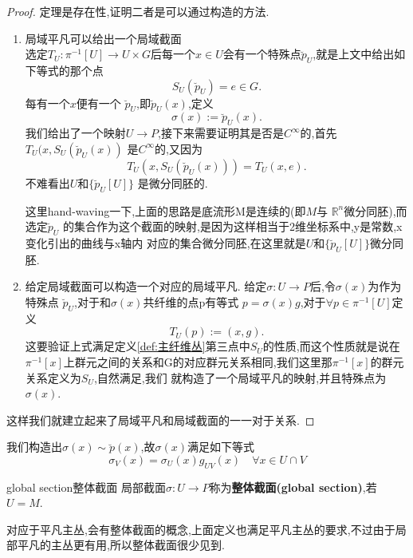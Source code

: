 \documentclass[../main.tex]{subfiles}
\begin{document}
\begin{proof}
  定理是存在性,证明二者是可以通过构造的方法.
  \begin{enumerate}
    \item 局域平凡可以给出一个局域截面\\
  选定$T_U:\pi^{-1}[U]\to U\times G$后每一个$x\in U$会有一个特殊点$\breve{p}_U$,就是上文中给出如下等式的那个点
  \[
  S_U(\breve{p}_U) = e \in G
  .\] 
  每有一个$x$便有一个 $\breve{p}_U$,即$\breve{p}_U(x)$,定义\[
 \sigma(x) := \breve{p}_U(x) 
  .\]
  我们给出了一个映射$U\to P$,接下来需要证明其是否是$C^\infty$的,首先$T_U(x,S_U(\breve{p}_U(x))$ 是$C^\infty$的,又因为\[
 T_U(x,S_U(\breve{p}_U(x))) = T_U(x,e) 
  .\]
  不难看出$U$和$\{\breve{p}_U[U]\}$ 是微分同胚的.
  \begin{note}
    这里hand-waving一下,上面的思路是底流形M是连续的(即$M$与 $\mathbb{R}^n$微分同胚),而选定$\breve{p}_U$ 的集合作为这个截面的映射,是因为这样相当于2维坐标系中,y是常数,x变化引出的曲线与x轴内
    对应的集合微分同胚,在这里就是$U$和$\{\breve{p}_U[U]\}$微分同胚.
  \end{note}
\item 给定局域截面可以构造一个对应的局域平凡.
  给定$\sigma: U \to P$后,令$\sigma(x)$为作为特殊点 $\breve{p}_U$,对于和$\sigma(x)$共纤维的点p有等式 $p = \sigma(x)g$,对于$\forall p \in \pi^{-1}[U]$定义\[
 T_U(p) := (x,g) 
 .\] 
 这要验证上式满足定义\ref{def:主纤维丛}第三点中$S_U$的性质,而这个性质就是说在$\pi^{-1}[x]$上群元之间的关系和G的对应群元关系相同,我们这里那$\pi^{-1}[x]$的群元关系定义为$S_U$,自然满足,我们
 就构造了一个局域平凡的映射,并且特殊点为$\sigma(x)$.
  \end{enumerate}
  这样我们就建立起来了局域平凡和局域截面的一一对于关系.
\end{proof}
我们构造出$\sigma(x) \sim \breve{p}(x)$,故$\sigma(x)$满足如下等式 
 \begin{equation}
 \sigma_V(x) = \sigma_U(x)g_{UV}(x)\quad \forall x\in U\cap V 
 \label{eq:I-1-2} 
 \end{equation}
 \begin{definition}
 {global section}{整体截面}
 局部截面$\sigma:U \to P$称为\textbf{整体截面(global section)},若$U = M$.
 \end{definition}

 对应于平凡主丛,会有整体截面的概念,上面定义也满足平凡主丛的要求,不过由于局部平凡的主丛更有用,所以整体截面很少见到.
\end{document}
